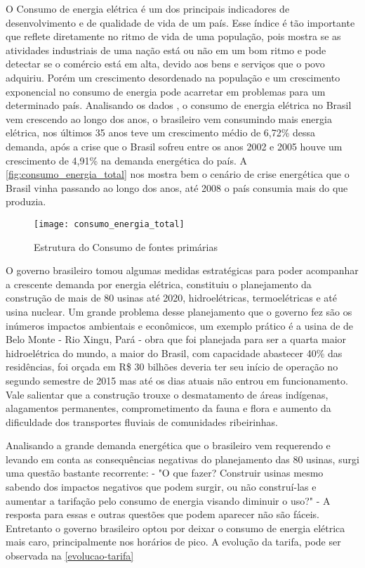 O Consumo de energia elétrica é um dos principais indicadores de desenvolvimento e de qualidade de vida 
de um país. Esse índice é tão importante que reflete diretamente no ritmo de vida de uma população, pois mostra
se as atividades industriais de uma nação está ou não em um bom ritmo e pode detectar se o comércio está em alta,
devido aos bens e serviços que o povo adquiriu. Porém um crescimento desordenado na população e um crescimento
exponencial no consumo de energia pode acarretar em problemas para um determinado país.
Analisando os dados \cite{epe-balanco-final}, o consumo de energia
elétrica no Brasil vem crescendo ao longo dos anos, o brasileiro vem consumindo mais energia elétrica, nos últimos
35 anos teve um crescimento médio de 6,72\% dessa demanda, após a crise que o Brasil sofreu entre os anos 2002 e 2005 houve um crescimento
de 4,91\% na demanda energética do país. A \autoref{fig:consumo_energia_total} nos mostra bem o cenário de crise energética que o Brasil vinha
passando ao longo dos anos, até 2008 o país consumia mais do que produzia.

\begin{figure}[h!]
	\texttt{[image: consumo\_energia\_total]}
	\centering
	\caption[Estrutura do Consumo de fontes primárias]{Estrutura do Consumo de fontes primárias}
	\label{fig:consumo_energia_total}
\end{figure}
\FloatBarrier

O governo brasileiro tomou algumas medidas estratégicas para poder acompanhar a crescente demanda por energia elétrica, constituiu o planejamento
da construção de mais de 80 usinas até 2020, hidroelétricas, termoelétricas e até usina nuclear. Um grande problema desse planejamento que o governo
fez são os inúmeros impactos ambientais e econômicos, um exemplo prático é a usina de de Belo Monte - Rio Xingu, Pará - obra que foi planejada
para ser a quarta maior hidroelétrica do mundo, a maior do Brasil, com capacidade abastecer 40\% das residências, foi orçada em R\$ 30 bilhões
deveria ter seu início de operação no segundo semestre de 2015 mas até os dias atuais não entrou em funcionamento. Vale salientar que a construção
trouxe o desmatamento de áreas indígenas, alagamentos permanentes, comprometimento da fauna e flora e aumento da dificuldade dos transportes fluviais
de comunidades ribeirinhas.

Analisando a grande demanda energética que o brasileiro vem requerendo e levando em conta as consequências negativas do planejamento das 80 usinas,
surgi uma questão bastante recorrente: - "O que fazer? Construir usinas mesmo sabendo dos impactos negativos que podem surgir, ou não construí-las e
aumentar a tarifação pelo consumo de energia visando diminuir o uso?" - A resposta para essas e outras questões que podem aparecer não são fáceis.
Entretanto o governo brasileiro optou por deixar o consumo de energia elétrica mais caro, principalmente nos horários de pico. A evolução da tarifa,
pode ser observada na \autoref{evolucao-tarifa}


